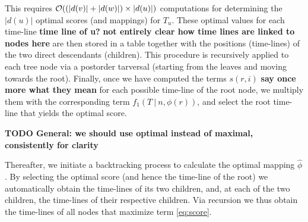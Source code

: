 \documentclass{llncs}
\begin{document}
This requires ${\cal O}((|d(v)|+|d(w)|)\times|d(u)|)$ computations for
determining the $|d(u)|$ optimal scores (and mappings) for $T_u$. These optimal
values for each time-line {\bf time line of u?} {\bf not entirely clear how time lines are linked to nodes here} 
are then stored in a table together with the positions (time-lines) of the two direct descendants (children).
This procedure is recursively applied to each tree node via a postorder tarversal 
(starting from the leaves and moving towards the root). Finally, once we have computed the terms
$s(r,i)$ {\bf say once more what they mean} for each possible time-line of the root node, we 
multiply them with the corresponding term $f_1(T\ |\ n, \phi(r))$, and select the root 
time-line that yields the optimal score.

{\bf TODO General: we should use optimal instead of maximal, consistently for clarity}

Thereafter, we initiate a backtracking process to calculate the optimal mapping $\hat\phi$. 
By selecting the optimal score (and hence the time-line of the root) we automatically obtain the time-lines of its two children, and,
at each of the two children, the time-lines of their respective children. Via recursion 
we thus obtain the time-lines of all nodes that maximize term \ref{eq:score}.
\end{document}
